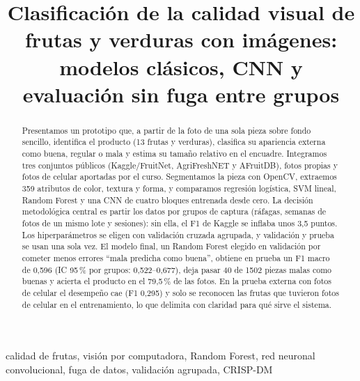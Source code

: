 \documentclass[conference]{IEEEtran}
\begin{document}
\title{Clasificación de la calidad visual de frutas y verduras con imágenes: modelos clásicos, CNN y evaluación sin fuga entre grupos}

\author{
\and
{}
\and
{}
}

\maketitle

\begin{abstract}
Presentamos un prototipo que, a partir de la foto de una sola pieza sobre fondo sencillo, identifica el producto (13 frutas y verduras), clasifica su apariencia externa como buena, regular o mala y estima su tamaño relativo en el encuadre. Integramos tres conjuntos públicos (Kaggle/FruitNet, AgriFreshNET y AFruitDB), fotos propias y fotos de celular aportadas por el curso. Segmentamos la pieza con OpenCV, extraemos 359 atributos de color, textura y forma, y comparamos regresión logística, SVM lineal, Random Forest y una CNN de cuatro bloques entrenada desde cero. La decisión metodológica central es partir los datos por grupos de captura (ráfagas, semanas de fotos de un mismo lote y sesiones): sin ella, el F1 de Kaggle se inflaba unos 3,5 puntos. Los hiperparámetros se eligen con validación cruzada agrupada, y validación y prueba se usan una sola vez. El modelo final, un Random Forest elegido en validación por cometer menos errores ``mala predicha como buena'', obtiene en prueba un F1 macro de 0,596 (IC 95\,\% por grupos: 0,522--0,677), deja pasar 40 de 1502 piezas malas como buenas y acierta el producto en el 79,5\,\% de las fotos. En la prueba externa con fotos de celular el desempeño cae (F1 0,295) y solo se reconocen las frutas que tuvieron fotos de celular en el entrenamiento, lo que delimita con claridad para qué sirve el sistema.
\end{abstract}

\begin{IEEEkeywords}
calidad de frutas, visión por computadora, Random Forest, red neuronal convolucional, fuga de datos, validación agrupada, CRISP-DM
\end{IEEEkeywords}
\end{document}
